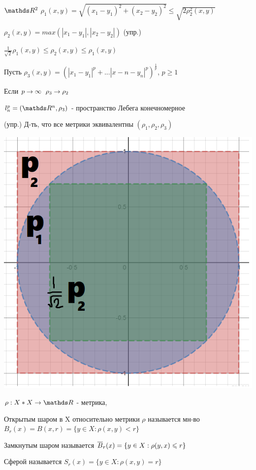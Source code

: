 \documentclass[main]{subfiles}
\begin{document}
    \begin{example}
        $\R^2$ $\rho_1(x,y) = \sqrt{(x_1-y_1)^2 + (x_2-y_2)^2} \leqslant \sqrt{2 \rho_2^2(x,y)}$

        $\rho_2(x,y)=max(|x_1-y_1|, |x_2-y_2|)$ (упр.)

        $\frac{1}{\sqrt{2}} \rho_1(x,y) \leqslant \rho_2(x,y) \leqslant \rho_1(x,y)$

        Пусть $\rho_3(x,y)=(|x_1-y_1|^p+...|x-n-y_n|^p)^{\frac{1}{p}}$, $p \geqslant 1$

        Если $p \rightarrow \infty$ $\rho_3 \rightarrow \rho_2$

        $l_n^p=(\R^n,\rho_3)$ - пространство Лебега конечномерное

        (упр.) Д-ть, что все метрики эквивалентны $(\rho_1,\rho_2,\rho_3)$

        \includegraphics[scale=0.3]{pics/p1p2p3.png}
    \end{example}

    \begin{definition}
        $\rho: X*X \ra \R$ - метрика,

        Открытым шаром в X относительно метрики $\rho$ называется мн-во $B_r(x)=B(x,r)=\{y \in X: \rho(x,y) < r \}$

        Замкнутым шаром называется $\overline{B}_r(x)=\{y \in X: \rho(y,x) \leqslant r \}$

        Сферой называется $S_r(x)=\{y \in X: \rho(x,y)=r \}$
    \end{definition}
\end{document}
